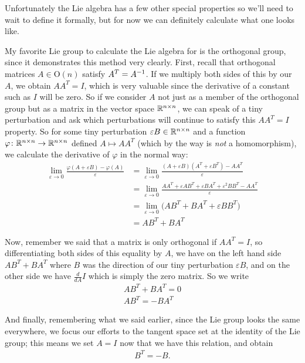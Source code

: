 \documentclass[11pt]{article}
\begin{document}
Unfortunately the Lie algebra has a few other special properties so we'll need to wait to define it formally, but for now we can definitely calculate what one looks like.

My favorite Lie group to calculate the Lie algebra for is the orthogonal group, since it demonstrates this method very clearly. First, recall that orthogonal matrices $A \in \mathrm{O}(n)$ satisfy $A^T = A^{-1}$. If we multiply both sides of this by our $A$, we obtain $AA^T = I$, which is very valuable since the derivative of a constant such as $I$ will be zero. So if we consider $A$ not just as a member of the orthogonal group but as a matrix in the vector space $\mathbb{R}^{n \times n}$, we can speak of a tiny perturbation and ask which perturbations will continue to satisfy this $AA^T = I$ property. So for some tiny perturbation $\varepsilon B \in \mathbb{R}^{n \times n}$ and a function $\varphi\colon \mathbb{R}^{n\times n} \to \mathbb{R}^{n\times n}$ defined $A \mapsto AA^T$ (which by the way is \emph{not} a homomorphism), we calculate the derivative of $\varphi$ in the normal way: \begin{align*}
\lim_{\varepsilon \to 0} \frac{\varphi(A + \varepsilon B) - \varphi(A)}{\varepsilon}
&= \lim_{\varepsilon \to 0} \frac{(A+\varepsilon B)(A^T+\varepsilon B^T) - AA^T}{\varepsilon} \\
&= \lim_{\varepsilon \to 0} \frac{AA^T + \varepsilon AB^T + \varepsilon BA^T + \varepsilon^2 BB^T - AA^T}{\varepsilon} \\
&= \lim_{\varepsilon \to 0} \Big(AB^T + BA^T + \varepsilon BB^T \Big) \\
&= AB^T + BA^T
\end{align*}

Now, remember we said that a matrix is only orthogonal if $AA^T = I$, so differentiating both sides of this equality by $A$, we have on the left hand side $AB^T + BA^T$ where $B$ was the direction of our tiny perturbation $\varepsilon B$, and on the other side we have $\frac{d}{dA} I$ which is simply the zero matrix. So we write \begin{gather*}
AB^T + BA^T = 0 \\
AB^T = - BA^T
\end{gather*}

And finally, remembering what we said earlier, since the Lie group looks the same everywhere, we focus our efforts to the tangent space set at the identity of the Lie group; this means we set $A = I$ now that we have this relation, and obtain \begin{gather*}
B^T = -B.
\end{gather*}
\end{document}
